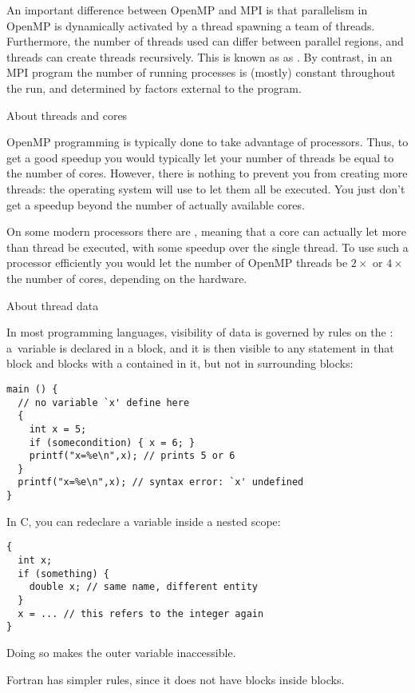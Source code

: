 An important difference between OpenMP and MPI is that parallelism in
OpenMP is dynamically activated by a thread spawning a team of
threads. Furthermore,
the number of threads used can differ between parallel regions, and
threads can create threads recursively. This is known as
as . By contrast, in an MPI program the number
of running processes is (mostly) constant throughout the run, and
determined by factors external to the program.

 {About threads and cores}

OpenMP programming is typically done to take advantage of
 processors. Thus, to get a good speedup you
would typically let your number of threads be equal to the number of
cores. However, there is nothing to prevent you from creating more
threads: the operating system will use  to let
them all be executed. You just don't get a speedup beyond the number
of actually available cores.

On some modern processors there are ,
meaning that a core can actually let more than thread be executed,
with some speedup over the single thread. To use such a processor
efficiently you would let the number of OpenMP threads be $2\times$ or
$4\times$ the number of cores, depending on the hardware.

 {About thread data}

In most programming languages, visibility of data
is governed by rules on the :
a~variable is declared in a block, and it is then visible to any
statement in that block and blocks with a 
contained in it, but not in surrounding blocks:
\begin{lstlisting}
main () {
  // no variable `x' define here
  {
    int x = 5;
    if (somecondition) { x = 6; }
    printf("x=%e\n",x); // prints 5 or 6
  }
  printf("x=%e\n",x); // syntax error: `x' undefined
}
\end{lstlisting}

In C, you can redeclare a variable inside a nested scope:
\begin{lstlisting}
{
  int x;
  if (something) {
    double x; // same name, different entity
  }
  x = ... // this refers to the integer again
}
\end{lstlisting}
Doing so makes the outer variable inaccessible.

Fortran has simpler rules, since it does not have blocks inside blocks.

